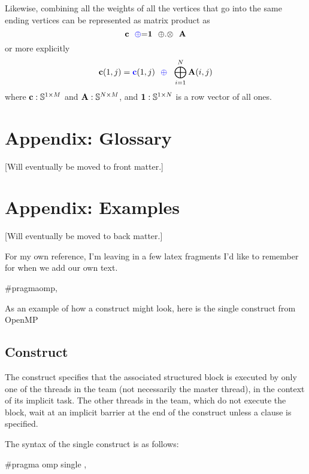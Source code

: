 Likewise, combining all the weights of all the vertices that go into the same ending vertices can be represented as matrix product as
$$
   {\bf c} ~~ {\textcolor{blue}{\oplus}}{=}  {\bf 1} ~~ {\oplus}.{\otimes} ~~{\bf A} 
$$
or more explicitly
$$
   {\bf c}(1,j) = {\textcolor{blue}{\bf c}}(1,j) ~~ {\textcolor{blue}{\oplus}} ~~ \bigoplus_{i=1}^N {\bf A}(i,j)
$$
where ${\bf c}: \mathbb{S}^{1 \times M}$ and ${\bf A}: \mathbb{S}^{N \times M}$, and ${\bf 1}: \mathbb{S}^{1 \times N}$ is a row vector of all ones.


\section{Appendix: Glossary}
  [Will eventually be moved to front matter.]

\section{Appendix: Examples}
  [Will eventually be moved to back matter.]


For my own reference, I'm leaving in a few latex fragments I'd like to remember for when we add our own text.


\begin{boxedcode}
\#pragma\plc{ }omp\plc{ directive-name [clause[ [},\plc{] clause] ... ] new-line}
\end{boxedcode}

As an example of how a construct might look, here is the single construct from OpenMP

\subsection{ Construct}
\label{subsec:single Construct}
\summary
The  construct specifies that the associated structured block is executed by only 
one of the threads in the team (not necessarily the master thread), in the context of its 
implicit task. The other threads in the team, which do not execute the block, wait at an 
implicit barrier at the end of the  construct unless a  clause is specified.

\parbox{\linewidth}{%
\syntax
\ccppspecificstart}
The syntax of the single construct is as follows:

\begin{boxedcode}
\#pragma omp single \plc{[clause[ [},\plc{] clause] ... ] new-line}
\end{boxedcode}

